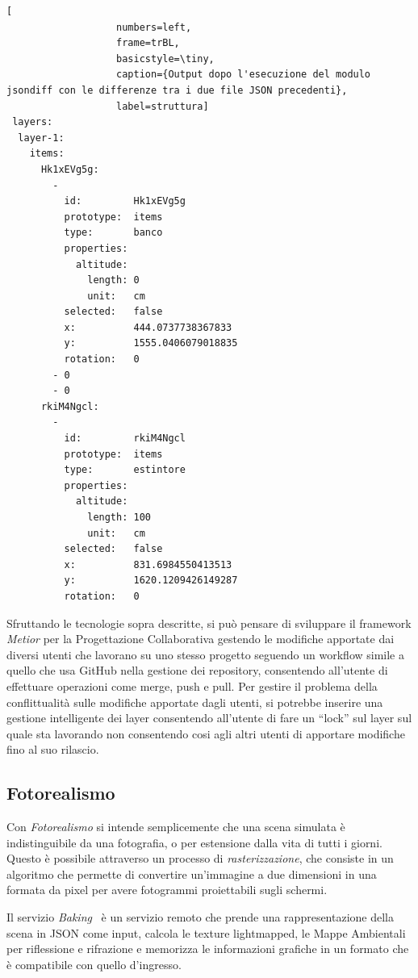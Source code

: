 \begin{lstlisting}[
                   numbers=left,
                   frame=trBL,
                   basicstyle=\tiny,
                   caption={Output dopo l'esecuzione del modulo jsondiff con le differenze tra i due file JSON precedenti},
                   label=struttura]
 layers:
  layer-1:
    items:
      Hk1xEVg5g:
        -
          id:         Hk1xEVg5g
          prototype:  items
          type:       banco
          properties:
            altitude:
              length: 0
              unit:   cm
          selected:   false
          x:          444.0737738367833
          y:          1555.0406079018835
          rotation:   0
        - 0
        - 0
      rkiM4Ngcl:
        -
          id:         rkiM4Ngcl
          prototype:  items
          type:       estintore
          properties:
            altitude:
              length: 100
              unit:   cm
          selected:   false
          x:          831.6984550413513
          y:          1620.1209426149287
          rotation:   0
\end{lstlisting}

Sfruttando le tecnologie sopra descritte, si può pensare di sviluppare il framework \emph{Metior}
per la Progettazione Collaborativa gestendo le modifiche apportate dai diversi utenti che lavorano su uno
stesso progetto seguendo un workflow simile a quello che usa GitHub nella gestione dei repository,
consentendo all'utente di effettuare operazioni come merge, push e pull.
Per gestire il problema della conflittualità sulle modifiche apportate dagli utenti,
si potrebbe inserire una gestione intelligente dei layer consentendo all'utente di fare un ``lock'' sul layer sul quale
sta lavorando non consentendo cosi agli altri utenti di apportare modifiche fino al suo rilascio.
\newpage

\subsection{Fotorealismo}
\label{sec:conclusions_section_2_sub_3}
Con \emph{Fotorealismo} si intende semplicemente che una scena simulata \`e indistinguibile da una fotografia, o per estensione
dalla vita di tutti i giorni. Questo è possibile attraverso un processo di \emph{rasterizzazione}, che consiste in un algoritmo che
permette di convertire un'immagine a due dimensioni in una formata da pixel per avere fotogrammi proiettabili sugli schermi.

Il servizio \emph{Baking}~\cite{baking} \`e un servizio remoto che prende una rappresentazione della scena in JSON come input,
calcola le texture lightmapped, le Mappe Ambientali per riflessione e rifrazione e memorizza le informazioni grafiche
in un formato che \`e compatibile con quello d'ingresso.\\

